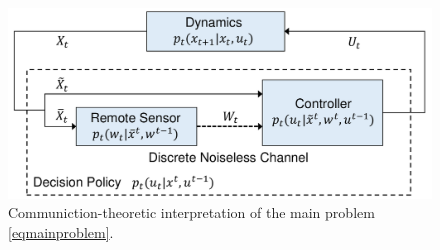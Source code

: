 \begin{figure}
\centering
\includegraphics[width=\columnwidth]{comm.pdf}
\caption{Communiction-theoretic interpretation of the main problem \eqref{eqmainproblem}.}
\label{fig:NCS}
\end{figure}


